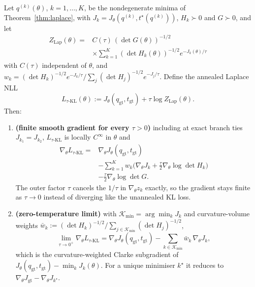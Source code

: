 \begin{theorem}\label{thm:annealed}
Let $q^{(k)}(\theta)$, $k=1,\dots,K$, be the nondegenerate minima of Theorem~\ref{thm:laplace}, with $J_k=J_\theta(q^{(k)},t^\star(q^{(k)}))$, $H_k\succ0$ and $G\succ0$, and let
\begin{equation}
\begin{split}
Z_{\mathrm{Lap}}(\theta)={}&C(\tau)\,(\det G(\theta))^{-1/2}\\
&\times\sum_{k=1}^K(\det H_k(\theta))^{-1/2}e^{-J_k(\theta)/\tau}
\end{split}
\label{eq:zlap}
\end{equation}
with $C(\tau)$ independent of $\theta$, and $w_k=(\det H_k)^{-1/2}e^{-J_k/\tau}/\sum_j(\det H_j)^{-1/2}e^{-J_j/\tau}$. Define the annealed Laplace NLL
\begin{equation}
L_{\tau\text{-KL}}(\theta):=J_\theta(q_{\mathrm{gt}},t_{\mathrm{gt}})+\tau\log Z_{\mathrm{Lap}}(\theta).
\label{eq:annealed}
\end{equation}
Then:
\begin{enumerate}
\item \textbf{(finite smooth gradient for every $\tau>0$)} including at exact branch ties $J_{k_1}=J_{k_2}$, $L_{\tau\text{-KL}}$ is locally $C^\infty$ in $\theta$ and
\begin{equation}
\begin{split}
\nabla_\theta L_{\tau\text{-KL}}={}&\nabla_\theta J_\theta(q_{\mathrm{gt}},t_{\mathrm{gt}})\\
&-\sum_{k=1}^Kw_k\Big(\nabla_\theta J_k+\frac{\tau}{2}\nabla_\theta\log\det H_k\Big)\\
&-\frac{\tau}{2}\nabla_\theta\log\det G .
\end{split}
\label{eq:annealedgrad}
\end{equation}
The outer factor $\tau$ cancels the $1/\tau$ in $\nabla_\theta z_k$ exactly, so the gradient stays finite as $\tau\to0$ instead of diverging like the unannealed KL loss.
\item \textbf{(zero-temperature limit)} with $\mathcal{K}_{\min}=\arg\min_kJ_k$ and curvature-volume weights $\bar w_k:=(\det H_k)^{-1/2}/\sum_{j\in\mathcal{K}_{\min}}(\det H_j)^{-1/2}$,
\begin{equation}
\lim_{\tau\to0^+}\nabla_\theta L_{\tau\text{-KL}}
=\nabla_\theta J_\theta(q_{\mathrm{gt}},t_{\mathrm{gt}})
-\sum_{k\in\mathcal{K}_{\min}}\bar w_k\,\nabla_\theta J_k,
\label{eq:clarke}
\end{equation}
which is the curvature-weighted Clarke subgradient of $J_\theta(q_{\mathrm{gt}},t_{\mathrm{gt}})-\min_kJ_k(\theta)$. For a unique minimiser $k^\star$ it reduces to $\nabla_\theta J_{\mathrm{gt}}-\nabla_\theta J_{k^\star}$.
\end{enumerate}
\end{theorem}

